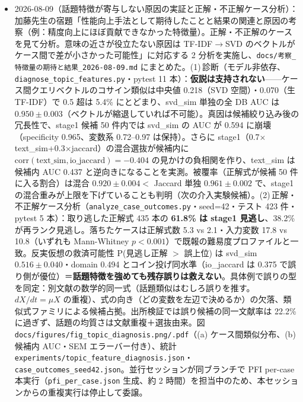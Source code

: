\documentclass[11pt,a4paper]{jsarticle}
\begin{document}
\begin{itemize}[nosep]
  \item 2026-08-09（話題特徴が寄与しない原因の実証と正解・不正解ケース分析）：加藤先生の宿題「性能向上手法として期待したことと結果の関連と原因の考察（例：精度向上にほぼ貢献できなかった特徴量）。正解・不正解のケースを見て分析。意味の近さが役立たない原因は TF-IDF$\to$SVD のベクトルがケース間で差が小さかった可能性」に対応する 2 分析を実施し、\texttt{docs/考察\_特徴量の期待と結果\_2026-08-09.md} にまとめた。(1)\,診断（モデル非依存、\texttt{diagnose\_topic\_features.py}・pytest 11 本）：\textbf{仮説は支持されない}——ケース間クエリベクトルのコサイン類似は中央値 0.218（SVD 空間）・0.070（生 TF-IDF）で 0.5 超は 5.4\% にとどまり、svd\_sim 単独の全 DB AUC は $0.950\pm0.003$（ベクトルが縮退していれば不可能）。真因は候補絞り込み後の冗長性で、stage1 候補 50 件内では svd\_sim の AUC が 0.594 に崩壊（specificity 0.965、変数系 0.72--0.97 は保持）。さらに stage1（0.7$\times$text\_sim+0.3$\times$jaccard）の混合選抜が候補内に $\mathrm{corr}(\text{text\_sim},\text{io\_jaccard})=-0.404$ の見かけの負相関を作り、text\_sim は候補内 AUC 0.437 と逆向きになることを実測。被覆率（正解式が候補 50 件に入る割合）は混合 $0.920\pm0.004<$ Jaccard 単独 $0.961\pm0.002$ で、stage1 の混合重みが上限を下げていることも判明（次の介入実験候補）。(2)\,正解・不正解ケース分析（\texttt{analyze\_case\_outcomes.py}・seed=42・テスト 423 件・pytest 5 本）：取り逃した正解式 435 本の \textbf{61.8\% は stage1 見逃し}、38.2\% が再ランク見逃し。落ちたケースは正解式数 5.3 vs 2.1・入力変数 17.8 vs 10.8（いずれも Mann-Whitney $p<0.001$）で既報の難易度プロファイルと一致。反実仮想の救済可能性 P(見逃し正解 $>$ 誤上位) は svd\_sim $0.516\pm0.040$・domain 0.494 とコイン投げ同水準（io\_jaccard は 0.375 で誤り側が優位）＝\textbf{話題特徴を強めても残存誤りは救えない}。具体例で誤りの型を同定：別文献の数学的同一式（話題類似はむしろ誤りを推す。$dX/dt=\mu X$ の重複）、式の向き（どの変数を左辺で決めるか）の欠落、類似式ファミリによる候補占拠。出所検証では誤り候補の同一文献率は 22.2\% に過ぎず、話題の均質さは文献重複＋選抜由来。図 \texttt{docs/figures/fig\_topic\_diagnosis.png/.pdf}（(a) ケース間類似分布、(b) 候補内 AUC・SEM エラーバー付き）、統計 \texttt{experiments/topic\_feature\_diagnosis.json}・\texttt{case\_outcomes\_seed42.json}。並行セッションが同ブランチで PFI per-case 本実行（\texttt{pfi\_per\_case.json} 生成、約 2 時間）を担当中のため、本セッションからの重複実行は停止して委譲。

\end{itemize}
\end{document}
